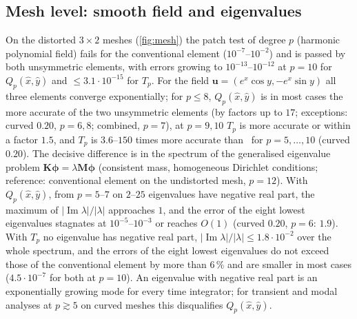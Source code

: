 \subsection{Mesh level: smooth field and eigenvalues}\label{sec:num-mesh}
On the distorted $3\times2$ meshes (\cref{fig:mesh}) the patch test of degree $p$ (harmonic
polynomial field) fails for the conventional element ($10^{-7}$--$10^{-2}$) and is passed by both
unsymmetric elements, with errors growing to $10^{-13}$--$10^{-12}$ at $p=10$ for $Q_p(\hat x,\hat
y)$ and $\le3.1\cdot10^{-15}$ for $T_p$. For the field $\bm u=(e^x\cos y,-e^x\sin y)$ all three elements
converge exponentially; for $p\le8$, $Q_p(\hat x,\hat y)$ is in most cases the more accurate of the
two unsymmetric elements (by factors up to $17$; exceptions: curved $0.20$, $p=6,8$; combined, $p=7$),
at $p=9,10$ $T_p$ is more accurate or within a factor $1.5$, and $T_p$ is $3.6$--$150$ times more accurate
than \PP\ for $p=5,\dots,10$ (curved $0.20$). The decisive difference
is in the spectrum of the generalised eigenvalue problem $\bm K\bm\phi=\lambda\bm M\bm\phi$ (consistent
mass, homogeneous Dirichlet conditions; reference: conventional element on the undistorted mesh,
$p=12$). With $Q_p(\hat x,\hat y)$, from $p=5$--$7$ on $2$--$25$ eigenvalues have negative real part,
the maximum of $|\operatorname{Im}\lambda|/|\lambda|$ approaches $1$, and the error of the eight
lowest eigenvalues stagnates at $10^{-5}$--$10^{-3}$ or reaches $O(1)$ (curved $0.20$, $p=6$: $1.9$).
With $T_p$ no eigenvalue has negative real part, $|\operatorname{Im}\lambda|/|\lambda|\le1.8\cdot10^{-2}$
over the whole spectrum, and the errors of the eight lowest eigenvalues do not exceed those of the
conventional element by more than $6\,\%$ and are smaller in most cases ($4.5\cdot10^{-7}$ for both at
$p=10$). An eigenvalue with negative real part
is an exponentially growing mode for every time integrator; for transient and modal analyses at
$p\gtrsim5$ on curved meshes this disqualifies $Q_p(\hat x,\hat y)$.

